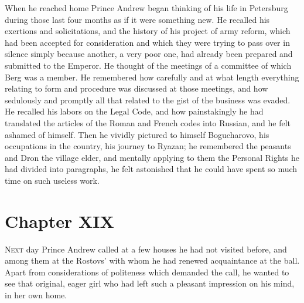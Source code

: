 When he reached home Prince Andrew began thinking of his life in
Petersburg during those last four months as if it were something
new. He recalled his exertions and solicitations, and the history
of his project of army reform, which had been accepted for
consideration and which they were trying to pass over in silence
simply because another, a very poor one, had already been
prepared and submitted to the Emperor. He thought of the meetings
of a committee of which Berg was a member. He remembered how
carefully and at what length everything relating to form and
procedure was discussed at those meetings, and how sedulously and
promptly all that related to the gist of the business was
evaded. He recalled his labors on the Legal Code, and how
painstakingly he had translated the articles of the Roman and
French codes into Russian, and he felt ashamed of himself. Then
he vividly pictured to himself Bogucharovo, his occupations in
the country, his journey to Ryazan; he remembered the peasants
and Dron the village elder, and mentally applying to them the
Personal Rights he had divided into paragraphs, he felt
astonished that he could have spent so much time on such useless
work.


\chapter*{Chapter XIX}
\ifaudio     
{} 
\fi

\lettrine[lines=2, loversize=0.3, lraise=0]{\initfamily N}{ext}
day Prince Andrew called at a few houses he had not visited
before, and among them at the Rostovs' with whom he had renewed
acquaintance at the ball. Apart from considerations of politeness
which demanded the call, he wanted to see that original, eager
girl who had left such a pleasant impression on his mind, in her
own home.

